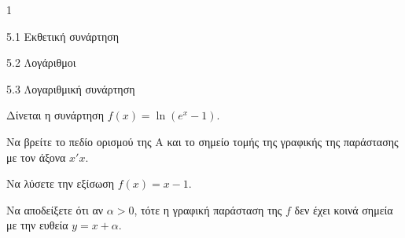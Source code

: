 \begin{ylh}{1}
\item 5.1 Εκθετική συνάρτηση
\item 5.2 Λογάριθμοι
\item 5.3 Λογαριθμική συνάρτηση
\end{ylh}
Δίνεται η συνάρτηση $f(x) = \ln(e^x - 1)$.
\begin{alist}
\item Να βρείτε το πεδίο ορισμού της Α και το σημείο τομής της γραφικής της παράστασης με τον άξονα $x'x$.
\item Να λύσετε την εξίσωση $f(x) = x - 1$.
\item Να αποδείξετε ότι αν $\alpha > 0$, τότε η γραφική παράσταση της $f$ δεν έχει κοινά σημεία με την ευθεία $y = x + \alpha$.
\end{alist}


